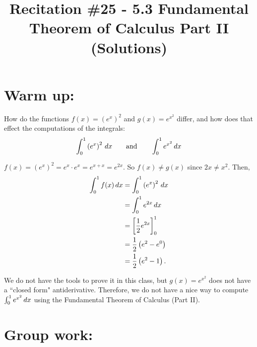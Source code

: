 \documentclass[nooutcomes]{ximera}
\title{Recitation \#25 - 5.3 Fundamental Theorem of Calculus Part II (Solutions)}
\begin{document}
\begin{abstract}		\end{abstract}
\maketitle

\section*{Warm up:} 
How do the functions $f(x) = \left( e^x \right)^2$ and $g(x) = e^{x^2}$ differ, and how does that effect the computations of the integrals:
$$ \int_0^1 \left(e^x \right)^2 \,d x	\qquad	\text{and}	\qquad	\int_0^1 e^{x^2} \,d x $$
		\begin{freeResponse}
		$f(x) = \left( e^x \right)^2 = e^x \cdot e^x = e^{x+x} = e^{2x}$.  
		So $f(x) \neq g(x)$ since $2x \neq x^2$.  
		Then,
			\begin{align*}
			\int_0^1 f(x) \,d x &= \int_0^1 \left(e^x \right)^2 \,d x  \\
			&= \int_0^1 e^{2x} \,d x  \\
			&= \bigg[ \frac{1}{2} e^{2x} \bigg]_0^1  \\
			&= \frac{1}{2} \left( e^2 - e^0 \right)  \\
			&= \frac{1}{2} \left( e^2 - 1 \right).  
			\end{align*}
			
		We do not have the tools to prove it in this class, but $g(x) = e^{x^2}$ does not have a ``closed form" antiderivative.  
		Therefore, we do not have a nice way to compute $\int_0^1 e^{x^2} \,d x$ using the Fundamental Theorem of Calculus (Part II).
		\end{freeResponse}	
		
		
		

	
	
	
	
	

\section*{Group work:}
\end{document}
